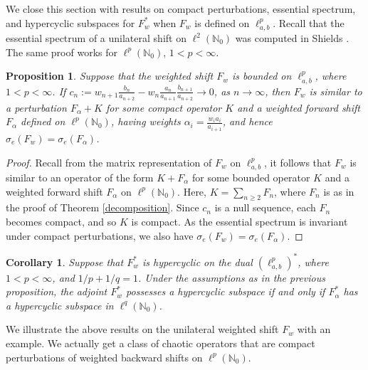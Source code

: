 \documentclass[12pt, reqno]{amsart}
\newtheorem{proposition}[theorem]{Proposition}
\newtheorem{corollary}[theorem]{Corollary}
\theoremstyle{definition}
\theoremstyle{remark}
\numberwithin{equation}{section}
\begin{document}
     We close this section with results on compact perturbations, essential spectrum, and hypercyclic subspaces for $F_w^*$ when $F_w$ is defined on $\ell^p_{a,b}$. Recall that the essential spectrum of a unilateral shift on $\ell^2(\mathbb{N}_{0})$ was computed in Shields \cite{Shields}. The same proof works for $\ell^p(\mathbb{N}_{0})$, $1<p<\infty$.
     
     \begin{proposition}\label{perturbation} 
         Suppose that the weighted shift $F_w$ is bounded on $\ell^p_{a,b}$, where $1<p<\infty$. If $
c_{n}:=w_{n+1}\frac{b_{n}}{a_{n+2}}-w_{n}\frac{a_n}{a_{n+1}}\frac{b_{n+1}}{a_{n+2}}\rightarrow 0$, as $n\rightarrow \infty$, then $F_w$ is similar to a perturbation $F_{\alpha}+K$ for some compact operator $K$ and a weighted forward shift $F_{\alpha}$ defined on $\ell^p(\mathbb{N}_{0})$, having weights $\alpha_i= \frac{w_ia_i}{a_{i+1}}$, and hence $\sigma_e(F_w)=\sigma_e(F_{\alpha})$.
     \end{proposition}
     \begin{proof}
         Recall from the matrix representation of $F_w$ on $\ell^p_{a,b}$, it follows that $F_w$ is similar to an operator of the form $K+F_{\alpha}$ for some bounded operator $K$ and a weighted forward shift $F_{\alpha}$ on $\ell^p(\mathbb{N}_{0})$. Here, $K=\sum_{n\geq 2} F_n$, where $F_n$ is as in the proof of Theorem \ref{decomposition}. Since $c_n$ is a null sequence, each $F_n$ becomes compact, and so $K$ is compact. As the essential spectrum is invariant under compact perturbations, we also have $\sigma_e(F_w)=\sigma_e(F_{\alpha})$.
     \end{proof}
     \begin{corollary}
Suppose that $F_w^*$ is hypercyclic on the dual $(\ell^p_{a,b})^*$, where $1<p<\infty$, and $1/p+1/q=1$. Under the assumptions as in the previous proposition, the adjoint $F_w^*$ possesses a hypercyclic subspace if and only if $F_{\alpha}^*$ has a hypercyclic subspace in $\ell^q(\mathbb{N}_{0})$.
     \end{corollary}
     We illustrate the above results on the unilateral weighted shift $F_w$ with an example. We actually get a class of chaotic operators that are compact perturbations of weighted backward shifts on $\ell^p(\mathbb{N}_0)$.
     
\end{document}
